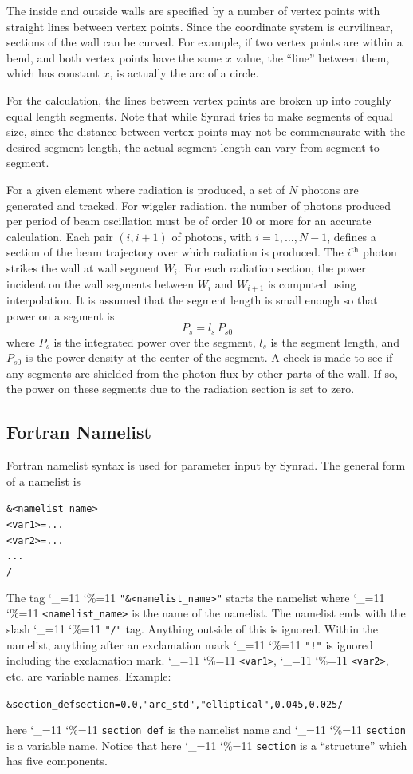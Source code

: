 \documentclass[11pt]{article}
\newcommand\ttcmd{\begingroup\catcode`\_=11 \catcode`\%=11 \dottcmd}
\newcommand\dottcmd[1]{\texttt{#1}\endgroup}
\newcommand{\vn}{\ttcmd}
\newenvironment{example}
  {\vspace{-3.0ex} \begin{alltt}}
  {\end{alltt} \vspace{-2.5ex}}
\begin{document}
The inside and outside walls are specified by a number of vertex
points with straight lines between vertex points. Since the coordinate
system is curvilinear, sections of the wall can be curved. For
example, if two vertex points are within a bend, and both vertex
points have the same $x$ value, the ``line'' between them, which has
constant $x$, is actually the arc of a circle. 

For the calculation, the lines between vertex points are broken up
into roughly equal length segments. Note that while Synrad
tries to make segments of equal size, since the distance between
vertex points may not be commensurate with the desired segment length,
the actual segment length can vary from segment to segment.

For a given element where radiation is produced, a set of $N$ photons
are generated and tracked. For wiggler radiation, the number of
photons produced per period of beam oscillation must be of order 10 or
more for an accurate calculation.  Each pair $(i, i+1)$ of photons, with
$i = 1, \ldots, N-1$, defines a section of the beam trajectory over which
radiation is produced.
The $i^{\mbox{th}}$ photon strikes
the wall at wall segment $W_i$. 
For each radiation section, the power incident on the wall segments between $W_i$
and $W_{i+1}$ is computed using interpolation. It is assumed that the
segment length is small enough so that power on a segment is
\begin{equation}
  P_s = l_s \, P_{s0}
\end{equation}
where $P_s$ is the integrated power over the segment, $l_s$ is the
segment length, and $P_{s0}$ is the power density at the center of the
segment. A check is made to see if any segments are shielded from the
photon flux by other parts of the wall. If so, the power on these
segments due to the radiation section is set to zero.

\subsection{Fortran Namelist}
\label{s:namelist}

Fortran namelist syntax is used for parameter input by Synrad. The
general form of a namelist is
\begin{example}
  &<namelist_name>
    <var1> = ...
    <var2> = ...
    ...
  /
\end{example}
The tag \vn{"\&<namelist_name>"} starts the namelist where
\vn{<namelist_name>} is the name of the namelist. The namelist ends
with the slash \vn{"/"} tag. Anything outside of this is
ignored. Within the namelist, anything after an exclamation mark
\vn{"!"} is ignored including the exclamation mark. \vn{<var1>},
\vn{<var2>}, etc. are variable names. Example:
\begin{example}
  &section_def section =   0.0, "arc_std", "elliptical", 0.045, 0.025 /
\end{example}
here \vn{section_def} is the namelist name and \vn{section} is a variable
name.  Notice that here \vn{section} is a ``structure'' which has five
components.
\end{document}

